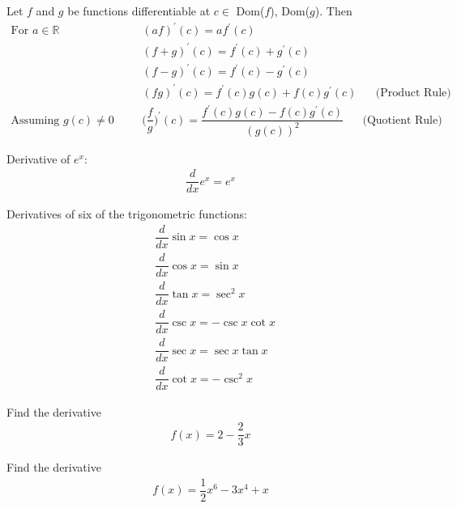 \begin{theorem}
Let $f$ and $g$ be functions differentiable at $c \in$ Dom($f$), Dom($g$). Then
\begin{align*}
    \text{For $a \in \mathbb{R}$} \hspace{20pt} &(af)^{'}(c) = af^{'}(c)\\[2ex]
    &(f+g)^{'}(c) = f^{'}(c) + g^{'}(c)\\[2ex]
    &(f-g)^{'}(c) = f^{'}(c) - g^{'}(c)\\[2ex]
    &(fg)^{'}(c) = f^{'}(c)g(c) + f(c)g^{'}(c) \hspace{20pt} \text{(Product Rule)}\\[2ex]
    \text{Assuming $g(c) \neq 0$} \hspace{20pt} &\Big(\dfrac{f}{g}\Big)^{'}(c) = \dfrac{f^{'}(c)g(c) - f(c)g^{'}(c)}{(g(c))^{2}} \hspace{20pt} \text{(Quotient Rule)}
\end{align*}
\end{theorem}

\begin{theorem}
Derivative of $e^{x}$:
\begin{align*}
    \dfrac{d}{dx}e^{x} = e^{x}
\end{align*}
\end{theorem}

\begin{theorem}
Derivatives of six of the trigonometric functions:
\begin{align*}
    &\dfrac{d}{dx}\sin x = \cos x\\[2ex]
    &\dfrac{d}{dx}\cos x = \sin x\\[2ex]
    &\dfrac{d}{dx}\tan x = \sec^{2} x\\[2ex]
    &\dfrac{d}{dx}\csc x = -\csc x \cot x\\[2ex]
    &\dfrac{d}{dx}\sec x = \sec x \tan x\\[2ex]
    &\dfrac{d}{dx}\cot x = -\csc^{2} x
\end{align*}
\end{theorem}

\begin{exercise}
Find the derivative
\begin{align*}
    f(x) = 2 - \dfrac{2}{3}x
\end{align*}
\end{exercise}

\begin{exercise}
Find the derivative 
\begin{align*}
    f(x) = \dfrac{1}{2}x^{6} - 3x^{4} + x
\end{align*}
\end{exercise}


